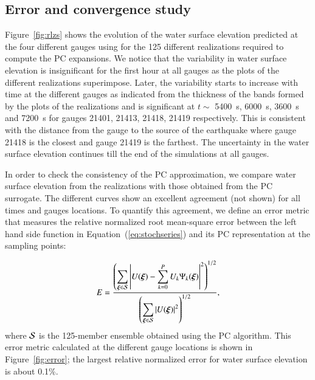 \subsection{Error and convergence study}
\label{sec:analysis}

Figure~\ref{fig:rlzs} shows the evolution of the
water surface elevation predicted at the four different gauges 
using \geoclaw for the 125 different realizations 
required to compute the PC expansions. We notice that the 
variability in water surface elevation is insignificant for the first 
hour at all gauges as the plots of the different realizations superimpose.
Later, the variability starts to increase with time at the different gauges 
as indicated from the thickness of the bands formed by the plots of the realizations
and is significant at $t\sim$ 5400~s, 6000~s, 3600~s and 7200~s
for gauges 21401, 21413, 21418, 21419 respectively.
This is consistent with the distance from the gauge to the source of the earthquake
where gauge 21418 is the closest and gauge 21419 is the farthest.
The uncertainty in the water surface  elevation continues till the end of the simulations
at all gauges.

In order to check the consistency of the PC approximation, we compare
water surface elevation from the realizations 
with those obtained from the PC surrogate. The different curves
show an excellent agreement (not shown) for all times and gauges locations.
To quantify this agreement, we define
an error metric that measures the relative normalized root mean-square error between the left hand side function 
in Equation~(\ref{eq:stochseries}) and its PC representation at the sampling points:

\begin{equation} 
   E = \frac{\displaystyle
         \left(\sum_{\xxi \in \NISP} \left|U(\xxi) - \sum_{k = 0}^{P}
U_k\Psi_k(\xxi)\right|^2
         \right)^{1/2}}
        {\displaystyle
          \left(\sum_{\xxi \in \NISP} \left|U(\xxi)\right|^2\right)^{1/2} 
          },
\label{eq:error}
\end{equation}
where $\mathcal{S}$ is the 125-member ensemble obtained using the PC algorithm. 
This error metric calculated at the different gauge locations is shown in Figure~\ref{fig:error};
the largest relative normalized error for 
water surface elevation is about 0.1\%. 



